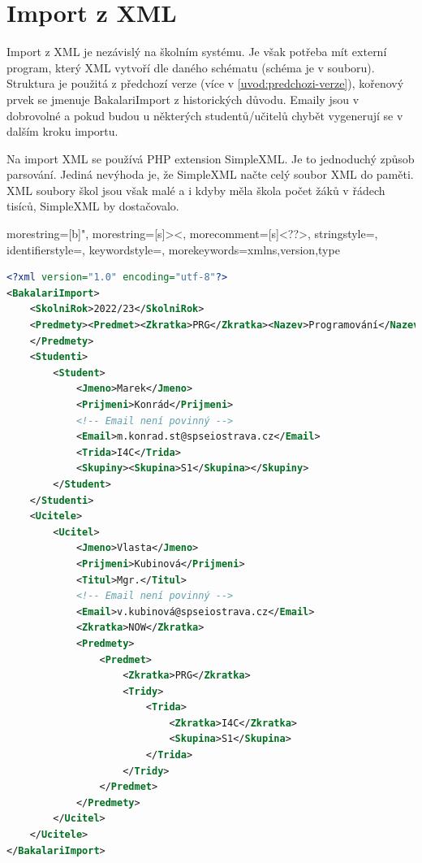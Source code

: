 \section{Import z XML}
Import z XML je nezávislý na školním systému. Je však potřeba mít externí program, který XML vytvoří dle daného schématu (schéma je v souboru). Struktura je použitá z předchozí verze (více v \ref{uvod:predchozi-verze}), kořenový prvek se jmenuje BakalariImport z historických důvodu. Emaily jsou v dobrovolné a pokud budou u některých studentů/učitelů chybět vygenerují se v dalším kroku importu.

Na import XML se používá PHP extension SimpleXML. Je to jednoduchý způsob parsování. Jediná nevýhoda je, že SimpleXML načte celý soubor XML do paměti. XML soubory škol jsou však malé a i kdyby měla škola počet žáků v řádech tisíců, SimpleXML by dostačovalo. 





{
  morestring=[b]",
  morestring=[s]{>}{<},
  morecomment=[s]{<?}{?>},
  stringstyle=\color{black},
  identifierstyle=\color{darkblue},
  keywordstyle=\color{cyan},
  morekeywords={xmlns,version,type}%
}
\begin{lstlisting}[language=XML,basicstyle=\small,caption={Ukázka struktury XML}]
<?xml version="1.0" encoding="utf-8"?>
<BakalariImport>
    <SkolniRok>2022/23</SkolniRok>
    <Predmety><Predmet><Zkratka>PRG</Zkratka><Nazev>Programování</Nazev></Predmet>
    </Predmety>
    <Studenti>
        <Student>
            <Jmeno>Marek</Jmeno>
            <Prijmeni>Konrád</Prijmeni>
            <!-- Email není povinný -->
            <Email>m.konrad.st@spseiostrava.cz</Email>
            <Trida>I4C</Trida>
            <Skupiny><Skupina>S1</Skupina></Skupiny>
        </Student>
    </Studenti>
    <Ucitele>
        <Ucitel>
            <Jmeno>Vlasta</Jmeno>
            <Prijmeni>Kubinová</Prijmeni>
            <Titul>Mgr.</Titul>
            <!-- Email není povinný -->
            <Email>v.kubinová@spseiostrava.cz</Email>
            <Zkratka>NOW</Zkratka>
            <Predmety>
                <Predmet>
                    <Zkratka>PRG</Zkratka>
                    <Tridy>
                        <Trida>
                            <Zkratka>I4C</Zkratka>
                            <Skupina>S1</Skupina>
                        </Trida>
                    </Tridy>
                </Predmet>
            </Predmety>
        </Ucitel>       
    </Ucitele>
</BakalariImport>
\end{lstlisting}


